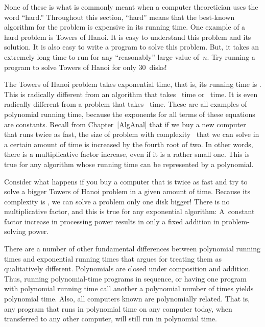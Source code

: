 None of these is what is commonly meant when a computer
theoretician uses the word ``hard.''
Throughout this section, ``hard'' means that the best-known algorithm
for the problem is expensive in its running time.
One example of a hard problem is Towers of
Hanoi.
It is easy to understand this problem and its solution.
It is also easy to write a program to solve this problem.
But, it takes an extremely long time to run for any ``reasonably''
large value of~\(n\).
Try running a program to solve Towers of Hanoi for only 30~disks!

The Towers of Hanoi problem takes exponential time, that is, its
running time is \Thetatwon.
This is radically different from an algorithm that takes
\Thetanlogn\ time or \Thetantwo\ time.
It is even radically different from a problem that takes
\Thetanfour\ time.
These are all examples of polynomial running time, because the
exponents for all terms of these equations are constants.
Recall from Chapter~\ref{AlgAnal}
that if we buy a new computer that runs twice as fast,
the size of problem with complexity \Thetanfour\ that we can solve
in a certain amount of time is increased by the fourth root of two.
In other words, there is a multiplicative factor increase, even if it
is a rather small one.
This is true for any algorithm whose running time can be represented
by a polynomial.

Consider what happens if you buy a computer that is twice as fast and
try to solve a bigger Towers of Hanoi problem in a given amount of
time.
Because its complexity is \Thetatwon, we can solve a problem only one
disk bigger!
There is no multiplicative factor, and this is true for any
exponential algorithm:
A~constant factor increase in processing
power results in only a fixed addition in problem-solving power.

There are a number of other fundamental differences between
polynomial running times and exponential running times that argues for
treating them as qualitatively different.
Polynomials are closed under composition and addition.
Thus, running polynomial-time programs in sequence, or having one
program with polynomial running time call another a polynomial number
of times yields polynomial time.
Also, all computers known are polynomially related.
That is, any program that runs in polynomial time on any computer
today, when transferred to any other computer, will still run in
polynomial time.

